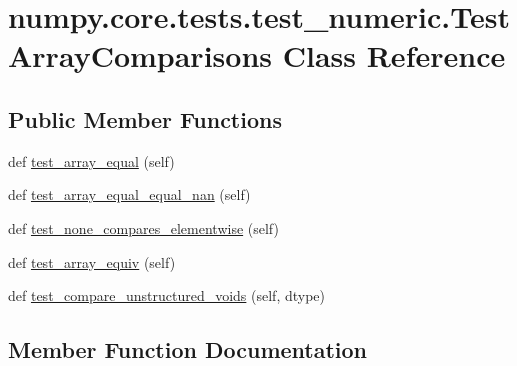 \hypertarget{classnumpy_1_1core_1_1tests_1_1test__numeric_1_1TestArrayComparisons}{}\section{numpy.\+core.\+tests.\+test\+\_\+numeric.\+Test\+Array\+Comparisons Class Reference}
\label{classnumpy_1_1core_1_1tests_1_1test__numeric_1_1TestArrayComparisons}
\subsection*{Public Member Functions}
\begin{DoxyCompactItemize}
\item 
def \hyperlink{classnumpy_1_1core_1_1tests_1_1test__numeric_1_1TestArrayComparisons_a04b0854b4b36680d23f2b10d0e8e98f4}{test\+\_\+array\+\_\+equal} (self)
\item 
def \hyperlink{classnumpy_1_1core_1_1tests_1_1test__numeric_1_1TestArrayComparisons_a599159482a76b6f6d1b8c02233f9f525}{test\+\_\+array\+\_\+equal\+\_\+equal\+\_\+nan} (self)
\item 
def \hyperlink{classnumpy_1_1core_1_1tests_1_1test__numeric_1_1TestArrayComparisons_a7422e1d81af2bcf7cf462c74ec8b91b2}{test\+\_\+none\+\_\+compares\+\_\+elementwise} (self)
\item 
def \hyperlink{classnumpy_1_1core_1_1tests_1_1test__numeric_1_1TestArrayComparisons_aa0a7374a723e15030b8c659264886195}{test\+\_\+array\+\_\+equiv} (self)
\item 
def \hyperlink{classnumpy_1_1core_1_1tests_1_1test__numeric_1_1TestArrayComparisons_aec7cf6ebd0673e5aabeeb9ccef6a1301}{test\+\_\+compare\+\_\+unstructured\+\_\+voids} (self, dtype)
\end{DoxyCompactItemize}


\subsection{Member Function Documentation}
\mbox{\label{classnumpy_1_1core_1_1tests_1_1test__numeric_1_1TestArrayComparisons_a04b0854b4b36680d23f2b10d0e8e98f4}} 
